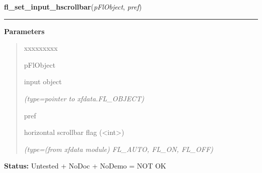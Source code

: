 \hspace{.8\funcindent}\begin{boxedminipage}{\funcwidth}

    \raggedright \textbf{fl\_set\_input\_hscrollbar}(\textit{pFlObject}, \textit{pref})

    \vspace{-1.5ex}

    \rule{\textwidth}{0.5\fboxrule}
\setlength{\parskip}{2ex}
\setlength{\parskip}{1ex}
      \textbf{Parameters}
      \vspace{-1ex}

      \begin{quote}
        \begin{Ventry}{xxxxxxxxx}

          \item[pFlObject]

          input object

            {\it (type=pointer to xfdata.FL\_OBJECT)}

          \item[pref]

          horizontal scrollbar flag ({\textless}int{\textgreater})

            {\it (type=(from xfdata module) FL\_AUTO, FL\_ON, FL\_OFF)}

        \end{Ventry}

      \end{quote}

\textbf{Status:} Untested + NoDoc + NoDemo = NOT OK



    \end{boxedminipage}

    \label{xformslib:flinput:fl_set_input_vscrollbar}

    \vspace{0.5ex}

